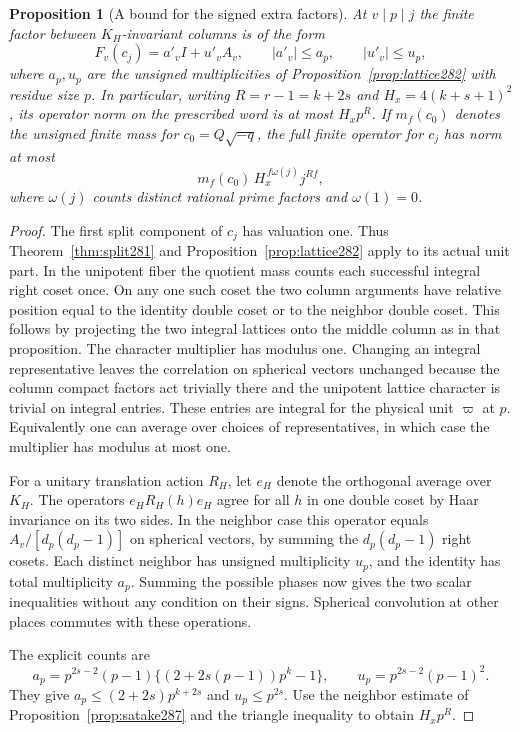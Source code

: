 \documentclass[a4paper,11pt]{article}
\newtheorem{proposition}{Proposition}[section]
\theoremstyle{definition}
\theoremstyle{remark}
\numberwithin{equation}{section}
\begin{document}
\begin{proposition}[A bound for the signed extra factors]\leavevmode
\label{prop:split287}
At \(v\mid p\mid j\) the finite factor between
\(K_H\)-invariant columns is of the form
\[
 F_v(c_j)=a'_v I+u'_v A_v,\qquad
 |a'_v|\le a_p,\qquad |u'_v|\le u_p ,
\]
where \(a_p,u_p\) are the unsigned multiplicities of
Proposition~\ref{prop:lattice282} with residue size \(p\).
In particular, writing \(R=r-1=k+2s\) and
\(H_x=4(k+s+1)^2\), its operator norm on the prescribed
word is at most \(H_xp^R\). If \(m_f(c_0)\) denotes
the unsigned finite mass for \(c_0=Q\sqrt{-q}\), the
full finite operator for \(c_j\) has norm at most
\[
           m_f(c_0)\,H_x^{\,f\omega(j)}j^{Rf},
\]
where \(\omega(j)\) counts distinct rational prime factors
and \(\omega(1)=0\).
\end{proposition}
\begin{proof}
The first split component of \(c_j\) has valuation one.
Thus Theorem~\ref{thm:split281} and
Proposition~\ref{prop:lattice282} apply to its actual unit
part. In the unipotent fiber the quotient mass counts each
successful integral right coset once. On any one such coset
the two column arguments have relative position equal to
the identity double coset or to the neighbor double coset.
This follows by projecting the two integral lattices onto
the middle column as in that proposition. The character
multiplier has modulus one. Changing an integral representative
leaves the correlation on spherical vectors unchanged because
the column compact factors act trivially there and the
unipotent lattice character is trivial on integral entries.
These entries are integral for the physical unit \(\varpi\)
at \(p\). Equivalently one can average over choices of
representatives, in which case the multiplier has modulus
at most one.

For a unitary translation action \(R_H\), let \(e_H\) denote
the orthogonal average over \(K_H\). The operators
\(e_H R_H(h)e_H\) agree for all \(h\) in one double coset
by Haar invariance on its two sides. In the neighbor case
this operator equals \(A_v/[d_p(d_p-1)]\) on spherical
vectors, by summing the \(d_p(d_p-1)\) right cosets.
Each distinct neighbor has unsigned multiplicity \(u_p\), and
the identity has total multiplicity \(a_p\). Summing the
possible phases now gives the two scalar inequalities
without any condition on their signs. Spherical convolution
at other places commutes with these operations.

The explicit counts are
\[
 a_p=p^{2s-2}(p-1)\{(2+2s(p-1))p^k-1\},\qquad
 u_p=p^{2s-2}(p-1)^2 .
\]
They give \(a_p\le(2+2s)p^{k+2s}\) and \(u_p\le p^{2s}\).
Use the neighbor estimate of Proposition~\ref{prop:satake287}
and the triangle inequality to obtain \(H_x p^R\).


\end{proof}
\end{document}
